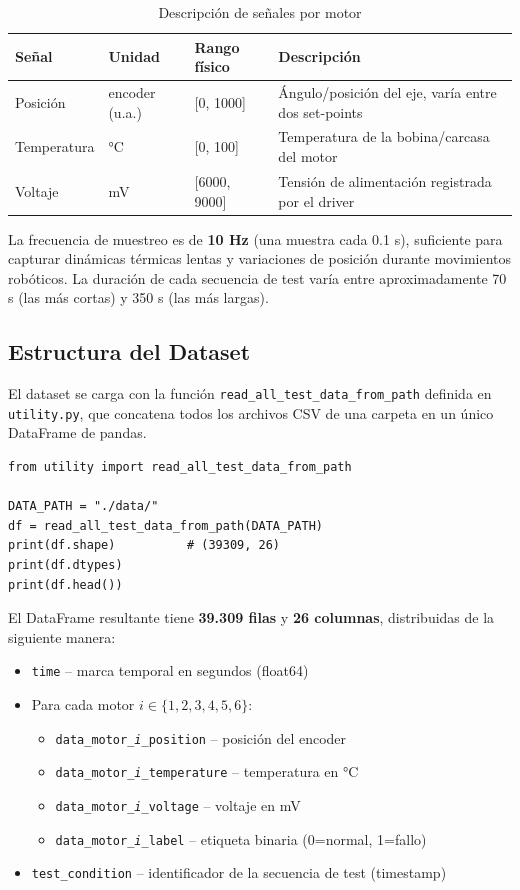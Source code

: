 \documentclass[12pt,a4paper]{article}
\begin{document}
\begin{table}[H]
\centering
\caption{Descripción de señales por motor}
\begin{tabular}{@{}llll@{}}
\toprule
\textbf{Señal} & \textbf{Unidad} & \textbf{Rango físico} & \textbf{Descripción}\\
\midrule
Posición    & encoder (u.a.) & [0, 1000]       & Ángulo/posición del eje, varía entre dos set-points\\
Temperatura & °C             & [0, 100]        & Temperatura de la bobina/carcasa del motor\\
Voltaje     & mV             & [6000, 9000]    & Tensión de alimentación registrada por el driver\\
\bottomrule
\end{tabular}
\end{table}

La frecuencia de muestreo es de \textbf{10 Hz} (una muestra cada 0.1 s), suficiente
para capturar dinámicas térmicas lentas y variaciones de posición durante movimientos
robóticos. La duración de cada secuencia de test varía entre aproximadamente 70 s
(las más cortas) y 350 s (las más largas).

\subsection{Estructura del Dataset}

El dataset se carga con la función \texttt{read\_all\_test\_data\_from\_path} definida
en \texttt{utility.py}, que concatena todos los archivos CSV de una carpeta en un único
DataFrame de pandas.

\begin{lstlisting}[caption={Carga del dataset completo}, label={lst:load}]
from utility import read_all_test_data_from_path

DATA_PATH = "./data/"
df = read_all_test_data_from_path(DATA_PATH)
print(df.shape)          # (39309, 26)
print(df.dtypes)
print(df.head())
\end{lstlisting}

El DataFrame resultante tiene \textbf{39.309 filas} y \textbf{26 columnas}, distribuidas
de la siguiente manera:

\begin{itemize}[leftmargin=2em]
  \item \texttt{time} – marca temporal en segundos (float64)
  \item Para cada motor $i \in \{1, 2, 3, 4, 5, 6\}$:
    \begin{itemize}
      \item \texttt{data\_motor\_\textit{i}\_position} – posición del encoder
      \item \texttt{data\_motor\_\textit{i}\_temperature} – temperatura en °C
      \item \texttt{data\_motor\_\textit{i}\_voltage} – voltaje en mV
      \item \texttt{data\_motor\_\textit{i}\_label} – etiqueta binaria (0=normal, 1=fallo)
    \end{itemize}
  \item \texttt{test\_condition} – identificador de la secuencia de test (timestamp)
\end{itemize}
\end{document}
